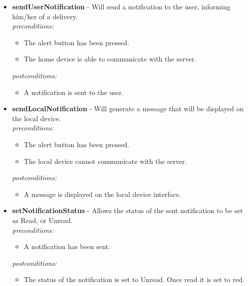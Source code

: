\documentclass[a4paper,12pt]{article}
\begin{document}
	\begin{itemize}
		\item \textbf{sendUserNotification} - Will send a notification to the user, informing him/her of a delivery.\\[0.5cm]
		\textit{preconditions:}
		\begin{itemize}
			\item The alert button has been pressed.
			\item The home device is able to communicate with the server.
		\end{itemize}
		
		\textit{postconditions:}
		\begin{itemize}
			\item A notification is sent to the user.\\[0.5cm]
		\end{itemize}
		
		\item \textbf{sendLocalNotification} -  Will generate a message that will be displayed on the local device.\\[0.5cm]
		\textit{preconditions:}
		\begin{itemize}
			\item The alert button has been pressed.
			\item The local device cannot communicate with the server.
		\end{itemize}
		
		\textit{postconditions:}
		\begin{itemize}
			\item A message is displayed on the local device interface.\\[0.5cm]
		\end{itemize}
		
		\item \textbf{setNotificationStatus} -  Allows the status of the sent notification to be set as Read, or Unread.\\[0.5cm]
		\textit{preconditions:}
		\begin{itemize}
			\item A notification has been sent.
		\end{itemize}
		
		\textit{postconditions:}
		\begin{itemize}
			\item The status of the notification is set to Unread. Once read it is set to red.\\[0.5cm]
		\end{itemize}
		

\end{itemize}
\end{document}
